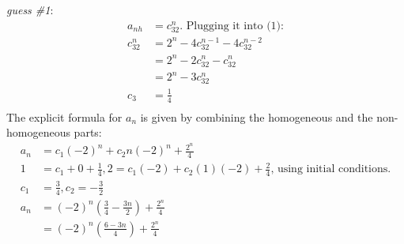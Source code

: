     \textit{guess \#1}:
    \begin{align*}
        a_{nh} &= c_32^n
        \text{. Plugging it into (1):}\\
        c_32^n &= 2^n - 4c_32^{n-1} - 4c_32^{n-2}\\
        &= 2^n - 2c_32^{n} - c_32^{n}\\
        &= 2^n - 3c_32^{n}\\
        c_3 & = \frac{1}{4}\\
    \end{align*}
    The explicit formula for $a_n$ is given by combining
    the homogeneous and the non-homogeneous parts:
    \begin{align*}
        a_n &= c_1(-2)^n + c_2n(-2)^n+\frac{2^n}{4}\\
        1 &= c_1 + 0 + \frac{1}{4},
        2 = c_1(-2) + c_2(1)(-2) + \frac{2}{4}
        \text{, using initial conditions.}\\
        c_1 &= \frac{3}{4}, c_2=-\frac{3}{2}\\
        a_n &= (-2)^n(\frac{3}{4} - \frac{3n}{2}) + \frac{2^n}{4}\\
        &= \boxed{(-2)^n(\frac{6-3n}{4}) + \frac{2^n}{4}}
    \end{align*}
    